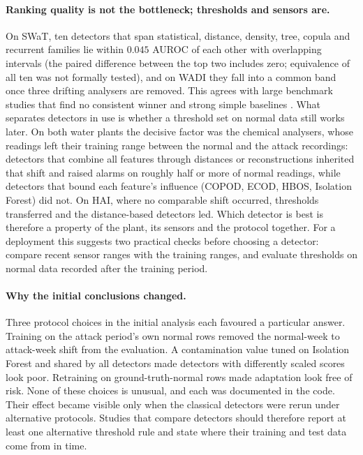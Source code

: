 \documentclass[11pt]{article}
\begin{document}
\paragraph{Ranking quality is not the bottleneck; thresholds and sensors are.}
On SWaT, ten detectors that span statistical, distance, density, tree, copula and
recurrent families lie within $0.045$ AUROC of each other with overlapping intervals (the
paired difference between the top two includes zero; equivalence of all ten was not
formally tested), and on WADI they fall into a common
band once three drifting analysers are removed. This agrees with large benchmark studies
that find no consistent winner and strong simple baselines
\citep{audibert2022,sarfraz2024}. What separates detectors in use is whether a threshold
set on normal data still works later. On both water plants the decisive factor was the
chemical analysers, whose readings left their training range between the normal and the
attack recordings: detectors that combine all features through distances or
reconstructions inherited that shift and raised alarms on roughly half or more of normal
readings, while detectors that bound each feature's influence (COPOD, ECOD, HBOS,
Isolation Forest) did not. On HAI, where no comparable shift occurred, thresholds
transferred and the distance-based detectors led. Which detector is best is therefore a
property of the plant, its sensors and the protocol together. For a deployment this
suggests two practical checks before choosing a detector: compare recent sensor ranges
with the training ranges, and evaluate thresholds on normal data recorded after the
training period.

\paragraph{Why the initial conclusions changed.} Three protocol choices in the
initial analysis each favoured a particular answer. Training on the attack period's
own normal rows removed the normal-week to attack-week shift from the evaluation.
A contamination value tuned on Isolation Forest and shared by all detectors made
detectors with differently scaled scores look poor. Retraining on
ground-truth-normal rows made adaptation look free of risk. None of these
choices is unusual, and each was documented in the code. Their effect became
visible only when the classical detectors were rerun under alternative protocols.
Studies that compare detectors should therefore report at least one alternative
threshold rule and state where their training and test data come from in time.
\end{document}

